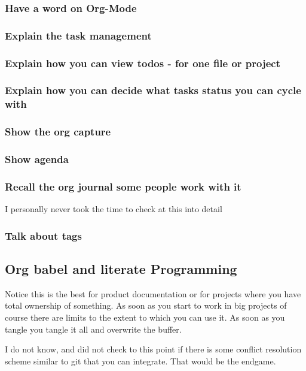\documentclass[a4paper]{article}
\begin{document}
\subsubsection{Have a word on Org-Mode}
\label{sec:org0fbfa94}
\subsubsection{Explain the task management}
\label{sec:org0d8dedf}
\subsubsection{Explain how you can view todos - for one file or project}
\label{sec:orgdba07ee}
\subsubsection{Explain how you can decide what tasks status you can cycle with}
\label{sec:org470a10a}
\subsubsection{Show the org capture}
\label{sec:org55cd71e}
\subsubsection{Show agenda}
\label{sec:orge4bd6ff}
\subsubsection{Recall the org journal some people work with it}
\label{sec:org01c1641}

I  personally never took the time to check at this into detail
\subsubsection{Talk about tags}
\label{sec:orge495ac9}


\subsection{Org babel and literate Programming}
\label{sec:org6a1802a}
Notice this is the best for product documentation or for projects
where you have total ownership of something. As soon as you start
to work in big projects of course there are limits to the extent to
which you can use it. As soon as you tangle you tangle it all and
overwrite the buffer.

I do not know, and did not check to this point if there is some
conflict resolution scheme similar to git that you can
integrate. That would be the endgame.
\end{document}
